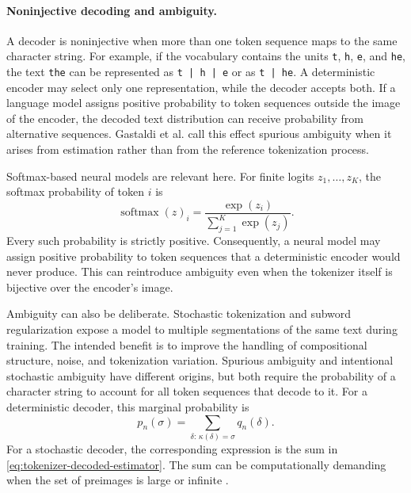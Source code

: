 \paragraph{Noninjective decoding and ambiguity.}
A decoder is noninjective when more than one token sequence maps to the same character string. For example, if the vocabulary contains the units \texttt{t}, \texttt{h}, \texttt{e}, and \texttt{he}, the text \texttt{the} can be represented as \texttt{t | h | e} or as \texttt{t | he}. A deterministic encoder may select only one representation, while the decoder accepts both. If a language model assigns positive probability to token sequences outside the image of the encoder, the decoded text distribution can receive probability from alternative sequences. Gastaldi et al. call this effect spurious ambiguity when it arises from estimation rather than from the reference tokenization process.

Softmax-based neural models are relevant here. For finite logits \(z_1,\ldots,z_K\), the softmax probability of token \(i\) is
\begin{equation}
    \operatorname{softmax}(z)_i
    =
    \frac{\exp(z_i)}
    {\sum_{j=1}^{K}\exp(z_j)}.
    \label{eq:tokenizer-softmax}
\end{equation}
Every such probability is strictly positive. Consequently, a neural model may assign positive probability to token sequences that a deterministic encoder would never produce. This can reintroduce ambiguity even when the tokenizer itself is bijective over the encoder's image.

Ambiguity can also be deliberate. Stochastic tokenization and subword regularization expose a model to multiple segmentations of the same text during training. The intended benefit is to improve the handling of compositional structure, noise, and tokenization variation. Spurious ambiguity and intentional stochastic ambiguity have different origins, but both require the probability of a character string to account for all token sequences that decode to it. For a deterministic decoder, this marginal probability is
\begin{equation}
    p_n(\sigma)
    =
    \sum_{\delta:\,\kappa(\delta)=\sigma}q_n(\delta).
    \label{eq:tokenizer-marginalization}
\end{equation}
For a stochastic decoder, the corresponding expression is the sum in \cref{eq:tokenizer-decoded-estimator}. The sum can be computationally demanding when the set of preimages is large or infinite \parencite{gastaldi2025foundations}.

